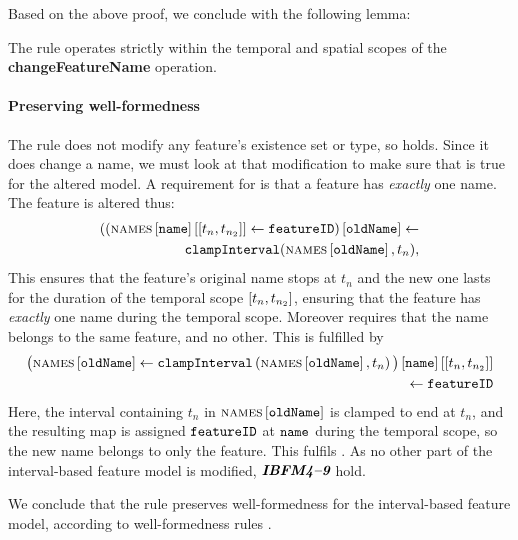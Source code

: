 Based on the above proof, we conclude with the following lemma:
\\

\begin{lemma}
   The  rule operates strictly within the temporal and spatial scopes of the \textbf{changeFeatureName} operation.
   \label{lemma:change-feature-name-scope}
\end{lemma}

\paragraph{Preserving well-formedness}
The rule does not modify any feature's existence set or type, so  holds. Since it does change a name, we must look at that modification to make sure that  is true for the altered model. A requirement for  is that a feature has \emph{exactly} one name. 
The feature is altered thus:
\[
   \begin{split}
        (\lookup{\left(\lookup{\lookup{\names{}}{\var{name}}}{\interval{t_n}{t_{n_2}}} \assign \var{featureID}\right)}{\var{oldName}} \assign \\
        \var{clampInterval}(\lookup{\names}{\var{oldName}}, t_n), \\
   \end{split}
\]
This ensures that the feature's original name stops at $t_n$ and the new one lasts for the duration of the temporal scope $\interval{t_n}{t_{n_2}}$, ensuring that the feature has \emph{exactly} one name during the temporal scope.
Moreover  requires that the name belongs to the same feature, and no other. This is fulfilled by 
\[
   \begin{split}
        \lookup{\lookup{\big(\lookup{\names{}}{\var{oldName}} \assign 
        \var{clampInterval}\left(\lookup{\names}{\var{oldName}}, t_n\right) \big)}{\var{name}}}{\interval{t_n}{t_{n_2}}} \\
        \assign \var{featureID} \\
   \end{split}
\]
Here, the interval containing $t_n$ in $\textsc{names} \left[ \texttt{oldName} \right]$ is clamped to end at $t_n$, and the resulting map is assigned $\texttt{featureID}$ at $\texttt{name}$ during the temporal scope, so the new name belongs to only the feature. This fulfils .
As no other part of the interval-based feature model is modified, $\textit{\textbf{IBFM4\textendash 9}}$ hold.

We conclude that the  rule preserves well-formedness for the interval-based feature model, according to well-formedness rules . 
\\


